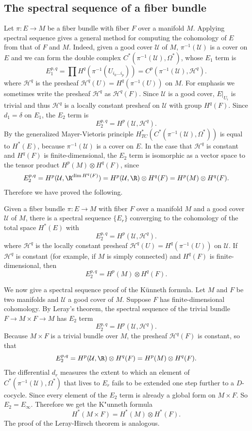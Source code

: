 \subsection{The spectral sequence of a fiber bundle}
Let $\pi:E\to M$ be a fiber bundle with fiber $F$ over a manifold $M$. Applying spectral sequence gives a general method for computing the cohomology of $E$ from that 
of $F$ and $M$. Indeed, given a good cover $\mathcal{U}$ of $M$, $\pi^{-1}(\mathcal{U})$ is a cover on $E$ and we can form the double complex 
$C^*(\pi^{-1}(\mathcal{U}),\Omega^*)$, whose $E_1$ term is
\[E_1^{p,q}=\prod H^q(\pi^{-1}(U_{i_0\dots i_p}))=C^p(\pi^{-1}(\mathcal{U}),\mathscr{H}^q).\]
where $\mathscr{H}^q$ is the presheaf $\mathscr{H}^q(U)=H^q(\pi^{-1}(U))$ on $M$. For emphasis we sometimes write the presheaf $\mathscr{H}^q$ as $\mathscr{H}^q(F)$. 
Since $\mathcal{U}$ is a good cover, $E|_{U_i}$ is trivial and thus $\mathscr{H}^q$ is a locally constant presheaf on $\mathcal{U}$ with group $H^q(F)$. Since $d_1=\delta$ 
on $E_1$, the $E_2$ term is
\[E_2^{p,q}=H^p(\mathcal{U},\mathscr{H}^q).\]
By the generalized Mayer-Vietoris principle $H^*_{TC}(C^*(\pi^{-1}(\mathcal{U}),\Omega^*))$ is equal to $H^*(E)$, because $\pi^{-1}(\mathcal{U})$ is a cover on $E$. 
In the case that $\mathscr{H}^q$ is constant and $H^q(F)$ is finite-dimensional, the $E_2$ term is isomorphic as a vector space to the tensor product $H^p(M)\otimes H^q(F)$, 
since
\[E_2^{p,q}=H^p(\mathcal{U},\R^{\dim H^q(F)})=H^p(\mathcal{U},\R)\otimes H^q(F)=H^p(M)\otimes H^q(F).\]
Therefore we have proved the following.
\begin{proposition}
Given a fiber bundle $\pi:E\to M$ with fiber $F$ over a manifold $M$ and a good cover $\mathcal{U}$ of $M$, there is a spectral sequence $\{E_r\}$ converging to the 
cohomology of the total space $H^*(E)$ with
\[E_2^{p,q}=H^p(\mathcal{U},\mathscr{H}^q).\]
where $\mathscr{H}^q$ is the locally constant presheaf $\mathscr{H}^q(U)=H^q(\pi^{-1}(U))$ on $\mathcal{U}$. If $\mathscr{H}^q$ is constant (for example, if $M$ is 
simply connected) and $H^q(F)$ is finite-dimensional, then
\[E_2^{p,q}=H^p(M)\otimes H^q(F).\]
\end{proposition}
\begin{example}
We now give a spectral sequence proof of the K\"unneth formula. Let $M$ and $F$ be two manifolds and $\mathcal{U}$ a good cover of $M$. Suppose $F$ has 
finite-dimensional cohomology. By Leray's theorem, the spectral sequence of the trivial bundle $F\to M\times F\to M$ has $E_2$ term
\[E_2^{p,q}=H^p(\mathcal{U},\mathscr{H}^q).\]
Because $M\times F$ is a trivial bundle over $M$, the presheaf $\mathscr{H}^q(F)$ is constant, so that
\[E_2^{p,q}=H^p(\mathcal{U},\R)\otimes H^q(F)=H^p(M)\otimes H^q(F).\]
The differential $d_r$ measures the extent to which an element of $C^*(\pi^{-1}(\mathcal{U}),\Omega^*)$ that lives to $E_r$ fails to be extended one step further to a 
$D$-cocycle. Since every element of the $E_2$ term is already a global form on $M\times F$. So $E_2=E_{\infty}$. Therefore we get the K"unneth formula
\[H^*(M\times F)=H^*(M)\otimes H^*(F).\]
The proof of the Leray-Hirsch theorem is analogous.
\end{example}
